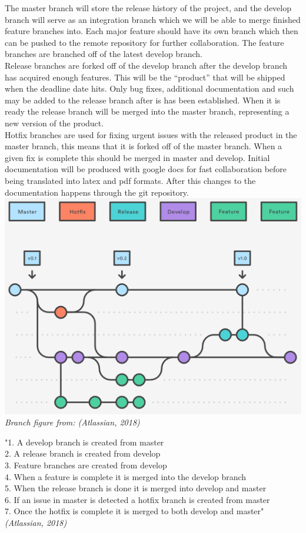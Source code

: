 \documentclass[12pt]{article}%
\begin{document}
The master branch will store the release history of the project, and the develop 		branch will serve as an integration branch which we will be able to merge finished 	feature branches into. Each major feature should have its own branch which then can be pushed to the remote repository for further collaboration. The feature branches are branched off of the latest develop branch. \\
Release branches are forked off of the develop branch after the develop branch has acquired enough features. This will be the “product” that will be shipped when the deadline date hits. Only bug fixes, additional documentation and such may be added to the release branch after is has been established. When it is ready the release branch will be merged into the master branch, representing a new version of the product. \\
Hotfix branches are used for fixing urgent issues with the released product in the master branch, this means that it is forked off of the master branch. When a given fix is complete this should be merged in master and develop.
Initial documentation will be produced with google docs for fast collaboration before being translated into latex and pdf formats. After this changes to the documentation happens through the git repository. \\

\includegraphics[scale=0.8]{image12.png} \\
\textit{Branch figure from: (Atlassian, 2018)}
\vspace{5mm}

\noindent
"1. A develop branch is created from master\\
2. A release branch is created from develop\\
3. Feature branches are created from develop\\
4. When a feature is complete it is merged into the develop branch\\
5. When the release branch is done it is merged into develop and master\\
6. If an issue in master is detected a hotfix branch is created from master\\
7. Once the hotfix is complete it is merged to both develop and master"\\
\textit{(Atlassian, 2018)}
\end{document}

